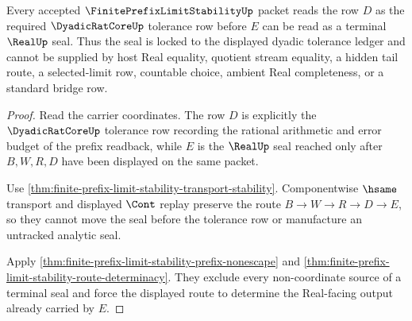 \begin{theorem}
\label{thm:finite-prefix-limit-stability-tolerance-seal-lock}
Every accepted $\FinitePrefixLimitStabilityUp$ packet reads the row $D$ as the required $\DyadicRatCoreUp$ tolerance row before $E$ can be read as a terminal $\RealUp$ seal. Thus the seal is locked to the displayed dyadic tolerance ledger and cannot be supplied by host Real equality, quotient stream equality, a hidden tail route, a selected-limit row, countable choice, ambient Real completeness, or a standard bridge row.
\end{theorem}
\begin{proof}
Read the carrier coordinates. The row $D$ is explicitly the $\DyadicRatCoreUp$ tolerance row recording the rational arithmetic and error budget of the prefix readback, while $E$ is the $\RealUp$ seal reached only after $B,W,R,D$ have been displayed on the same packet.

Use \autoref{thm:finite-prefix-limit-stability-transport-stability}. Componentwise $\hsame$ transport and displayed $\Cont$ replay preserve the route $B \to W \to R \to D \to E$, so they cannot move the seal before the tolerance row or manufacture an untracked analytic seal.

Apply \autoref{thm:finite-prefix-limit-stability-prefix-nonescape} and \autoref{thm:finite-prefix-limit-stability-route-determinacy}. They exclude every non-coordinate source of a terminal seal and force the displayed route to determine the Real-facing output already carried by $E$.
\end{proof}

